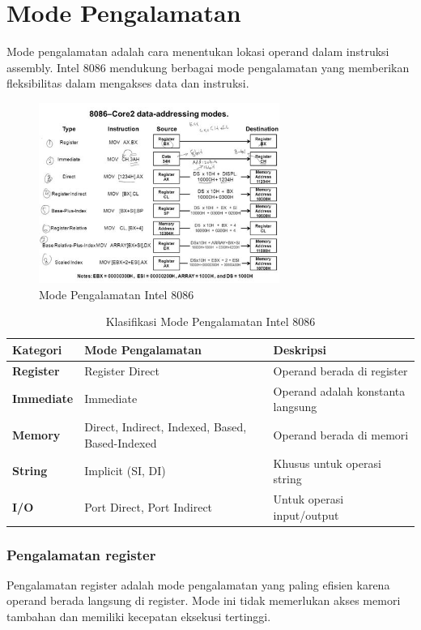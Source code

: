 \section{Mode Pengalamatan}
Mode pengalamatan adalah cara menentukan lokasi operand dalam instruksi assembly. Intel 8086 mendukung berbagai mode pengalamatan yang memberikan fleksibilitas dalam mengakses data dan instruksi.

\begin{figure}[h]
\centering
\includegraphics[width=0.7\textwidth]{8086_addressing_modes.jpg}
\caption{Mode Pengalamatan Intel 8086}
\label{fig:8086-addressing-modes}
\end{figure}

\begin{table}[h]
\centering
\caption{Klasifikasi Mode Pengalamatan Intel 8086}
\begin{tabular}{|p{3cm}|p{4cm}|p{8cm}|}
\hline
\textbf{Kategori} & \textbf{Mode Pengalamatan} & \textbf{Deskripsi} \\
\hline
\textbf{Register} & Register Direct & Operand berada di register \\
\hline
\textbf{Immediate} & Immediate & Operand adalah konstanta langsung \\
\hline
\textbf{Memory} & Direct, Indirect, Indexed, Based, Based-Indexed & Operand berada di memori \\
\hline
\textbf{String} & Implicit (SI, DI) & Khusus untuk operasi string \\
\hline
\textbf{I/O} & Port Direct, Port Indirect & Untuk operasi input/output \\
\hline
\end{tabular}
\label{tab:addressing-modes-classification}
\end{table}

\subsubsection{Pengalamatan register}
Pengalamatan register adalah mode pengalamatan yang paling efisien karena operand berada langsung di register. Mode ini tidak memerlukan akses memori tambahan dan memiliki kecepatan eksekusi tertinggi.

